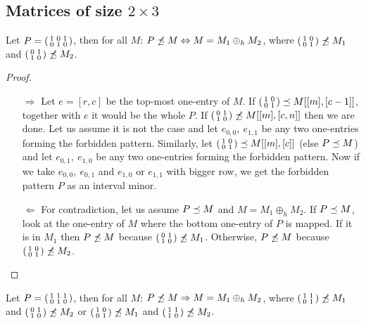 \subsection{Matrices of size $2\times3$}
\begin{thm}
Let $P=\left(\begin{smallmatrix}1&0&1\\0&1&0\end{smallmatrix}\right)$, then for all $M$: $P\not\preceq M\Leftrightarrow M=M_1\oplus_hM_2$, where $\left(\begin{smallmatrix}1&0\\0&1\end{smallmatrix}\right)\not\preceq M_1$ and $\left(\begin{smallmatrix}0&1\\1&0\end{smallmatrix}\right)\not\preceq M_2$.
\end{thm}
\begin{proof}
\begin{itemize}
\item[$\Rightarrow$] Let $e=[r,c]$ be the top-most one-entry of $M$. If $\left(\begin{smallmatrix}1&0\\0&1\end{smallmatrix}\right)\preceq M[[m],[c-1]]$, together with $e$ it would be the whole $P$. If $\left(\begin{smallmatrix}0&1\\1&0\end{smallmatrix}\right)\not\preceq M[[m],[c,n]]$ then we are done. Let us assume it is not the case and let $e_{0,0},\ e_{1,1}$ be any two one-entries forming the forbidden pattern. Similarly, let $\left(\begin{smallmatrix}1&0\\0&1\end{smallmatrix}\right)\preceq M[[m],[c]]$ (else $P\preceq M$) and let $e_{0,1},\ e_{1,0}$ be any two one-entries forming the forbidden pattern. Now if we take $e_{0,0},\ e_{0,1}$ and $e_{1,0}$ or $e_{1,1}$ with bigger row, we get the forbidden pattern $P$ as an interval minor. 
\item[$\Leftarrow$] For contradiction, let us assume $P\preceq M$ and $M=M_1\oplus_hM_2$. If $P\preceq M$, look at the one-entry of $M$ where the bottom one-entry of $P$ is mapped. If it is in $M_1$ then $P\not\preceq M$ because $\left(\begin{smallmatrix}0&1\\1&0\end{smallmatrix}\right)\not\preceq M_1$. Otherwise, $P\not\preceq M$ because $\left(\begin{smallmatrix}1&0\\0&1\end{smallmatrix}\right)\not\preceq M_2$.
\end{itemize}
\end{proof}
\begin{lemma}
\label{lemma2}
Let $P=\left(\begin{smallmatrix}1&1&1\\0&1&0\end{smallmatrix}\right)$, then for all $M$: $P\not\preceq M\Rightarrow M=M_1\oplus_hM_2$, where $\left(\begin{smallmatrix}1&1\\0&1\end{smallmatrix}\right)\not\preceq M_1$ and $\left(\begin{smallmatrix}0&1\\1&0\end{smallmatrix}\right)\not\preceq M_2$ or $\left(\begin{smallmatrix}1&0\\0&1\end{smallmatrix}\right)\not\preceq M_1$ and $\left(\begin{smallmatrix}1&1\\1&0\end{smallmatrix}\right)\not\preceq M_2$.
\end{lemma}
